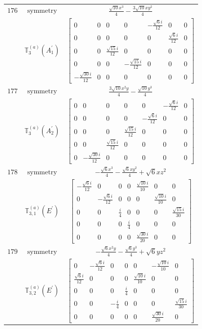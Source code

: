 \documentclass[fleqn,8pt,landscape]{jsarticle}
\begin{document}
\begin{longtable}{ccc}
$ 176 $ & $ \text{symmetry} $ & $ \frac{\sqrt{10} x^{3}}{4} - \frac{3 \sqrt{10} x y^{2}}{4} $ \\
$  $ & $ \mathbb{T}_{3}^{(a)}(A_{1}^{\prime}) $ & $ \begin{bmatrix} 0 & 0 & 0 & 0 & - \frac{\sqrt{6} i}{12} & 0 & 0 \\ 0 & 0 & 0 & 0 & 0 & \frac{\sqrt{6} i}{12} & 0 \\ 0 & 0 & \frac{\sqrt{15} i}{12} & 0 & 0 & 0 & 0 \\ 0 & 0 & 0 & - \frac{\sqrt{15} i}{12} & 0 & 0 & 0 \\ - \frac{\sqrt{30} i}{12} & 0 & 0 & 0 & 0 & 0 & 0 \end{bmatrix} $ \\ \hline
$ 177 $ & $ \text{symmetry} $ & $ \frac{3 \sqrt{10} x^{2} y}{4} - \frac{\sqrt{10} y^{3}}{4} $ \\
$  $ & $ \mathbb{T}_{3}^{(a)}(A_{2}^{\prime}) $ & $ \begin{bmatrix} 0 & 0 & 0 & 0 & 0 & - \frac{\sqrt{6} i}{12} & 0 \\ 0 & 0 & 0 & 0 & - \frac{\sqrt{6} i}{12} & 0 & 0 \\ 0 & 0 & 0 & \frac{\sqrt{15} i}{12} & 0 & 0 & 0 \\ 0 & 0 & \frac{\sqrt{15} i}{12} & 0 & 0 & 0 & 0 \\ 0 & - \frac{\sqrt{30} i}{12} & 0 & 0 & 0 & 0 & 0 \end{bmatrix} $ \\ \hline
$ 178 $ & $ \text{symmetry} $ & $ - \frac{\sqrt{6} x^{3}}{4} - \frac{\sqrt{6} x y^{2}}{4} + \sqrt{6} x z^{2} $ \\
$  $ & $ \mathbb{T}_{3,1}^{(a)}(E^{\prime}) $ & $ \begin{bmatrix} - \frac{\sqrt{6} i}{12} & 0 & 0 & 0 & \frac{\sqrt{10} i}{10} & 0 & 0 \\ 0 & - \frac{\sqrt{6} i}{12} & 0 & 0 & 0 & \frac{\sqrt{10} i}{10} & 0 \\ 0 & 0 & \frac{i}{4} & 0 & 0 & 0 & \frac{\sqrt{15} i}{30} \\ 0 & 0 & 0 & \frac{i}{4} & 0 & 0 & 0 \\ 0 & 0 & 0 & 0 & \frac{\sqrt{30} i}{20} & 0 & 0 \end{bmatrix} $ \\ \hline
$ 179 $ & $ \text{symmetry} $ & $ - \frac{\sqrt{6} x^{2} y}{4} - \frac{\sqrt{6} y^{3}}{4} + \sqrt{6} y z^{2} $ \\
$  $ & $ \mathbb{T}_{3,2}^{(a)}(E^{\prime}) $ & $ \begin{bmatrix} 0 & - \frac{\sqrt{6} i}{12} & 0 & 0 & 0 & - \frac{\sqrt{10} i}{10} & 0 \\ \frac{\sqrt{6} i}{12} & 0 & 0 & 0 & \frac{\sqrt{10} i}{10} & 0 & 0 \\ 0 & 0 & 0 & \frac{i}{4} & 0 & 0 & 0 \\ 0 & 0 & - \frac{i}{4} & 0 & 0 & 0 & \frac{\sqrt{15} i}{30} \\ 0 & 0 & 0 & 0 & 0 & \frac{\sqrt{30} i}{20} & 0 \end{bmatrix} $ \\ \hline

\end{longtable}
\end{document}
